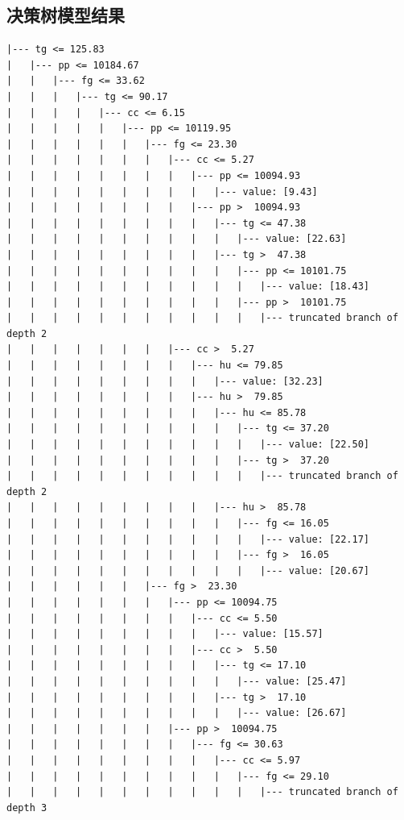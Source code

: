\documentclass[UTF8, a4paper]{ctexart}
\begin{document}
\subsection{决策树模型结果}\label{tree_result}
\begin{lstlisting}
|--- tg <= 125.83
|   |--- pp <= 10184.67
|   |   |--- fg <= 33.62
|   |   |   |--- tg <= 90.17
|   |   |   |   |--- cc <= 6.15
|   |   |   |   |   |--- pp <= 10119.95
|   |   |   |   |   |   |--- fg <= 23.30
|   |   |   |   |   |   |   |--- cc <= 5.27
|   |   |   |   |   |   |   |   |--- pp <= 10094.93
|   |   |   |   |   |   |   |   |   |--- value: [9.43]
|   |   |   |   |   |   |   |   |--- pp >  10094.93
|   |   |   |   |   |   |   |   |   |--- tg <= 47.38
|   |   |   |   |   |   |   |   |   |   |--- value: [22.63]
|   |   |   |   |   |   |   |   |   |--- tg >  47.38
|   |   |   |   |   |   |   |   |   |   |--- pp <= 10101.75
|   |   |   |   |   |   |   |   |   |   |   |--- value: [18.43]
|   |   |   |   |   |   |   |   |   |   |--- pp >  10101.75
|   |   |   |   |   |   |   |   |   |   |   |--- truncated branch of depth 2
|   |   |   |   |   |   |   |--- cc >  5.27
|   |   |   |   |   |   |   |   |--- hu <= 79.85
|   |   |   |   |   |   |   |   |   |--- value: [32.23]
|   |   |   |   |   |   |   |   |--- hu >  79.85
|   |   |   |   |   |   |   |   |   |--- hu <= 85.78
|   |   |   |   |   |   |   |   |   |   |--- tg <= 37.20
|   |   |   |   |   |   |   |   |   |   |   |--- value: [22.50]
|   |   |   |   |   |   |   |   |   |   |--- tg >  37.20
|   |   |   |   |   |   |   |   |   |   |   |--- truncated branch of depth 2
|   |   |   |   |   |   |   |   |   |--- hu >  85.78
|   |   |   |   |   |   |   |   |   |   |--- fg <= 16.05
|   |   |   |   |   |   |   |   |   |   |   |--- value: [22.17]
|   |   |   |   |   |   |   |   |   |   |--- fg >  16.05
|   |   |   |   |   |   |   |   |   |   |   |--- value: [20.67]
|   |   |   |   |   |   |--- fg >  23.30
|   |   |   |   |   |   |   |--- pp <= 10094.75
|   |   |   |   |   |   |   |   |--- cc <= 5.50
|   |   |   |   |   |   |   |   |   |--- value: [15.57]
|   |   |   |   |   |   |   |   |--- cc >  5.50
|   |   |   |   |   |   |   |   |   |--- tg <= 17.10
|   |   |   |   |   |   |   |   |   |   |--- value: [25.47]
|   |   |   |   |   |   |   |   |   |--- tg >  17.10
|   |   |   |   |   |   |   |   |   |   |--- value: [26.67]
|   |   |   |   |   |   |   |--- pp >  10094.75
|   |   |   |   |   |   |   |   |--- fg <= 30.63
|   |   |   |   |   |   |   |   |   |--- cc <= 5.97
|   |   |   |   |   |   |   |   |   |   |--- fg <= 29.10
|   |   |   |   |   |   |   |   |   |   |   |--- truncated branch of depth 3

\end{lstlisting}
\end{document}

